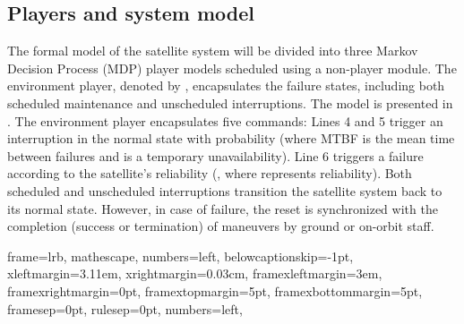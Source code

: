 

\subsection{Players and system model}
The formal model of the satellite system will be divided into three Markov Decision Process (MDP) player models scheduled using a non-player module. The environment player, denoted by , encapsulates the failure states, including both scheduled maintenance and unscheduled interruptions. The model is presented in . The environment player encapsulates five commands: Lines 4 and 5 trigger an interruption in the normal state with probability  (where MTBF is the mean time between failures and  is a temporary unavailability). Line 6 triggers a failure according to the satellite's reliability (, where  represents reliability). Both scheduled and unscheduled interruptions transition the satellite system back to its normal state. However, in case of failure, the reset is synchronized with the completion (success or termination) of maneuvers by ground or on-orbit staff.

{
	frame=lrb,         
	mathescape,
	numbers=left,
	belowcaptionskip=-1pt,
    xleftmargin=3.11em,
		xrightmargin=0.03cm,
    framexleftmargin=3em,
	framexrightmargin=0pt,
	framextopmargin=5pt,
	framexbottommargin=5pt,
	framesep=0pt,
	rulesep=0pt,
	numbers=left,
}
    


